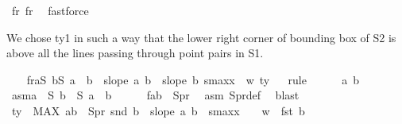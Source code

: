 \begin{isabellebody}
\ f{}r{}\ f{}r{}\ \isamarkupfalse%
\ fastforce%
\begin{isamarkuptext}%
We chose ty1 in such a way that the lower right corner of bounding box of S2 is above all
        the lines passing through point pairs in S1.%
\end{isamarkuptext}\isamarkuptrue%
\ \ \isamarkupfalse%
\ f{}r{}{\isacharcolon}{\kern0pt}{\isachardoublequoteopen}{\isasymforall}a{\isasymin}S{}{\isachardot}{\kern0pt}\ {\isasymforall}b{\isasymin}S{}{\isachardot}{\kern0pt}\ a\ {\isacharless}{\kern0pt}\ b\ {\isasymlongrightarrow}\ slope\ a\ b\ {\isacharless}{\kern0pt}\ slope\ b\ {\isacharparenleft}{\kern0pt}s{}{\isacharunderscore}{\kern0pt}maxx{\isacharplus}{\kern0pt}{}\ {\isacharplus}{\kern0pt}\ w{}{\isacharcomma}{\kern0pt}\ ty{}{\isacharplus}{\kern0pt}{}{\isacharparenright}{\kern0pt}{\isachardoublequoteclose}\isanewline
\ \ \isamarkupfalse%
{\isacharparenleft}{\kern0pt}rule{\isacharplus}{\kern0pt}{\isacharparenright}{\kern0pt}\isanewline
\ \ \ \ \isamarkupfalse%
\ a\ b\ \isamarkupfalse%
\ asm{\isacharcolon}{\kern0pt}{\isachardoublequoteopen}a\ {\isasymin}\ S{}{\isachardoublequoteclose}\ {\isachardoublequoteopen}b\ {\isasymin}\ S{}{\isachardoublequoteclose}\ {\isachardoublequoteopen}a\ {\isacharless}{\kern0pt}\ b{\isachardoublequoteclose}\isanewline
\ \ \ \ \isamarkupfalse%
\ f{}{\isacharcolon}{\kern0pt}{\isachardoublequoteopen}{\isacharparenleft}{\kern0pt}a{\isacharcomma}{\kern0pt}b{\isacharparenright}{\kern0pt}\ {\isasymin}\ S{}pr{\isachardoublequoteclose}\ \isamarkupfalse%
\ asm\ S{}pr{\isacharunderscore}{\kern0pt}def\ \isamarkupfalse%
\ blast\isanewline
\ \ \ \ \isamarkupfalse%
\ {\isachardoublequoteopen}ty{}\ {\isasymge}\ {\isacharparenleft}{\kern0pt}MAX\ {\isacharparenleft}{\kern0pt}a{\isacharcomma}{\kern0pt}b{\isacharparenright}{\kern0pt}\ {\isasymin}\ S{}pr{\isachardot}{\kern0pt}\ snd\ b\ {\isacharplus}{\kern0pt}\ {\isacharparenleft}{\kern0pt}slope\ a\ b{\isacharparenright}{\kern0pt}\ {\isacharasterisk}{\kern0pt}\ {\isacharparenleft}{\kern0pt}s{}{\isacharunderscore}{\kern0pt}maxx\ {\isacharplus}{\kern0pt}\ {}\ {\isacharplus}{\kern0pt}\ w{}\ {\isacharminus}{\kern0pt}\ fst\ b{\isacharparenright}{\kern0pt}{\isacharparenright}{\kern0pt}{\isachardoublequoteclose}\isanewline

\end{isabellebody}
